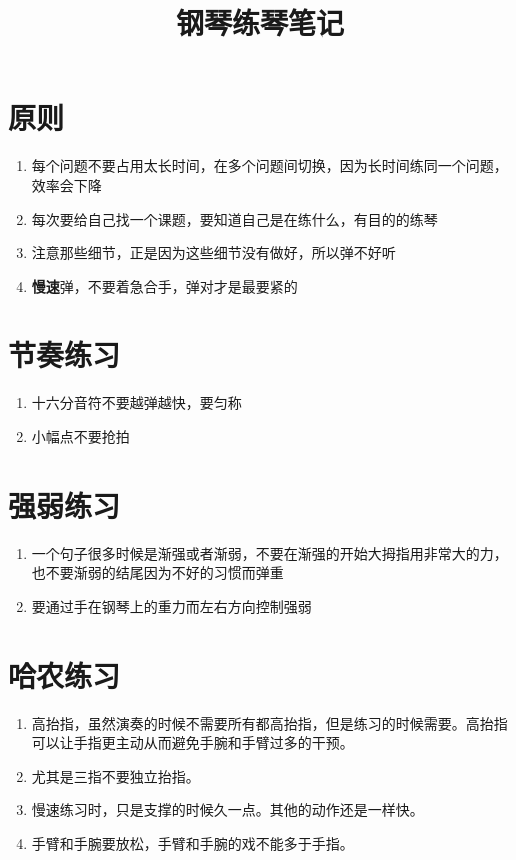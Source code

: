 \documentclass[UTF8]{ctexart}
\title{钢琴练琴笔记}
\begin{document}
\maketitle

\section{原则}

\begin{enumerate}
    \item 每个问题不要占用太长时间，在多个问题间切换，因为长时间练同一个问题，效率会下降
    \item 每次要给自己找一个课题，要知道自己是在练什么，有目的的练琴
    \item 注意那些细节，正是因为这些细节没有做好，所以弹不好听
    \item \textbf{慢速}弹，不要着急合手，弹对才是最要紧的
\end{enumerate}

\section{节奏练习}

\begin{enumerate}
    \item 十六分音符不要越弹越快，要匀称 
    \item 小幅点不要抢拍 
\end{enumerate}


\section{强弱练习}

\begin{enumerate}
    \item 一个句子很多时候是渐强或者渐弱，不要在渐强的开始大拇指用非常大的力，也不要渐弱的结尾因为不好的习惯而弹重
    \item 要通过手在钢琴上的重力而左右方向控制强弱 
\end{enumerate}



\section{哈农练习}

\begin{enumerate}
    \item 高抬指，虽然演奏的时候不需要所有都高抬指，但是练习的时候需要。高抬指可以让手指更主动从而避免手腕和手臂过多的干预。
    \item 尤其是三指不要独立抬指。
    \item 慢速练习时，只是支撑的时候久一点。其他的动作还是一样快。
    \item 手臂和手腕要放松，手臂和手腕的戏不能多于手指。
\end{enumerate}
\end{document}
